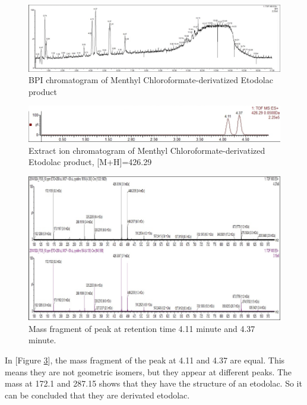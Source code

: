 \documentclass[12pt]{article} %
\begin{document}
\begin{figure}[h]
  \includegraphics[width=\linewidth]{bpi.png}
  \caption{BPI chromatogram of Menthyl Chloroformate-derivatized Etodolac product }
  \label{fig:fig2}
\end{figure}
\begin{figure}[h]
  \includegraphics[width=\linewidth]{fig3.png}
  \caption{Extract ion chromatogram of Menthyl Chloroformate-derivatized Etodolac product, [M+H]=426.29}
  \label{fig:fig3}
\end{figure}
\begin{figure}[h!]
  \includegraphics[width=\linewidth]{fig4.png}
  \caption{Mass fragment of peak at retention time 4.11 minute and 4.37 minute.}
  \label{fig:fig4}
\end{figure}

In [Figure \ref{fig:fig4}], the mass fragment of the peak at 4.11 and 4.37 are equal. This means they are not geometric isomers, but they appear at different peaks. The mass at 172.1 and 287.15 shows that they have the structure of an etodolac.\cite{cite3} So it can be concluded that they are derivated etodolac. 
\end{document}
